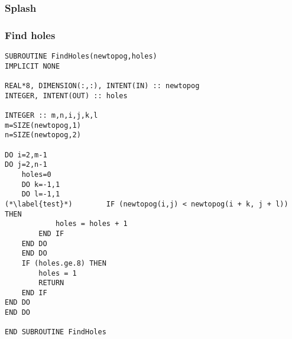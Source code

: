 

\begin{usessubs}
\end{usessubs}

\subsubsection{Splash}



\begin{usessubs}
\end{usessubs}

\subsubsection{Find holes}



\begin{lstlisting}[caption={a program listing could look like this;
notice the language sensitive formatting},label={lis:a-program-listing},breaklines=true,tabsize=4]
SUBROUTINE FindHoles(newtopog,holes) 
IMPLICIT NONE

REAL*8, DIMENSION(:,:), INTENT(IN) :: newtopog 
INTEGER, INTENT(OUT) :: holes

INTEGER :: m,n,i,j,k,l 
m=SIZE(newtopog,1) 
n=SIZE(newtopog,2)

DO i=2,m-1 
DO j=2,n-1   
    holes=0   
	DO k=-1,1   
	DO l=-1,1     
(*\label{test}*)		IF (newtopog(i,j) < newtopog(i + k, j + l)) THEN
	    	holes = holes + 1     
		END IF   
	END DO   
	END DO   
	IF (holes.ge.8) THEN     
		holes = 1     
		RETURN   
	END IF 
END DO 
END DO

END SUBROUTINE FindHoles
\end{lstlisting}


